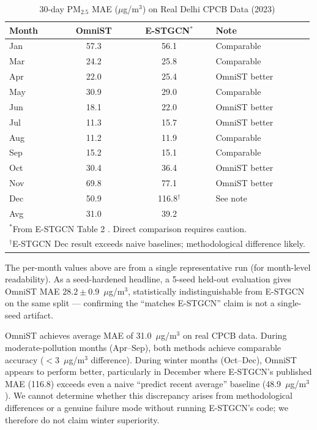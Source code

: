 \documentclass[journal]{IEEEtran}
\begin{document}
\begin{table}[htbp]
\caption{30-day PM$_{2.5}$ MAE ($\mu$g/m$^3$) on Real Delhi CPCB Data (2023)}
\centering
\begin{tabular}{lccl}
\toprule
\textbf{Month} & \textbf{OmniST} & \textbf{E-STGCN}$^*$ & \textbf{Note} \\
\midrule
Jan & 57.3 & 56.1 & Comparable \\
Mar & 24.2 & 25.8 & Comparable \\
Apr & 22.0 & 25.4 & OmniST better \\
May & 30.9 & 29.0 & Comparable \\
Jun & 18.1 & 22.0 & OmniST better \\
Jul & 11.3 & 15.7 & OmniST better \\
Aug & 11.2 & 11.9 & Comparable \\
Sep & 15.2 & 15.1 & Comparable \\
Oct & 30.4 & 36.4 & OmniST better \\
Nov & 69.8 & 77.1 & OmniST better \\
Dec & 50.9 & 116.8$^\dagger$ & See note \\
\midrule
Avg & 31.0 & 39.2 & \\
\bottomrule
\multicolumn{4}{l}{\footnotesize $^*$From E-STGCN Table 2 \cite{panja2026estgcn}. Direct comparison requires caution.} \\
\multicolumn{4}{l}{\footnotesize $^\dagger$E-STGCN Dec result exceeds naive baselines; methodological difference likely.} \\
\end{tabular}
\label{tab:monthly}
\end{table}

The per-month values above are from a single representative run (for month-level readability). As a
seed-hardened headline, a 5-seed held-out evaluation gives OmniST MAE $28.2\pm0.9$~$\mu$g/m$^3$,
statistically indistinguishable from E-STGCN on the same split --- confirming the ``matches
E-STGCN'' claim is not a single-seed artifact.

OmniST achieves average MAE of 31.0~$\mu$g/m$^3$ on real CPCB data. During moderate-pollution months (Apr--Sep), both methods achieve comparable accuracy ($<$3~$\mu$g/m$^3$ difference). During winter months (Oct--Dec), OmniST appears to perform better, particularly in December where E-STGCN's published MAE (116.8) exceeds even a naive ``predict recent average'' baseline (48.9~$\mu$g/m$^3$). We cannot determine whether this discrepancy arises from methodological differences or a genuine failure mode without running E-STGCN's code; we therefore do not claim winter superiority.
\end{document}
